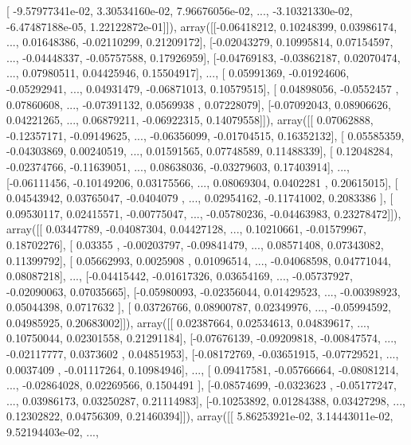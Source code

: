 \documentclass{article}
\begin{document}
       [ -9.57977341e-02,   3.30534160e-02,   7.96676056e-02, ...,
         -3.10321330e-02,  -6.47487188e-05,   1.22122872e-01]]), array([[-0.06418212,  0.10248399,  0.03986174, ...,  0.01648386,
        -0.02110299,  0.21209172],
       [-0.02043279,  0.10995814,  0.07154597, ..., -0.04448337,
        -0.05757588,  0.17926959],
       [-0.04769183, -0.03862187,  0.02070474, ...,  0.07980511,
         0.04425946,  0.15504917],
       ..., 
       [ 0.05991369, -0.01924606, -0.05292941, ...,  0.04931479,
        -0.06871013,  0.10579515],
       [ 0.04898056, -0.0552457 ,  0.07860608, ..., -0.07391132,
         0.0569938 ,  0.07228079],
       [-0.07092043,  0.08906626,  0.04221265, ...,  0.06879211,
        -0.06922315,  0.14079558]]), array([[ 0.07062888, -0.12357171, -0.09149625, ..., -0.06356099,
        -0.01704515,  0.16352132],
       [ 0.05585359, -0.04303869,  0.00240519, ...,  0.01591565,
         0.07748589,  0.11488339],
       [ 0.12048284, -0.02374766, -0.11639051, ...,  0.08638036,
        -0.03279603,  0.17403914],
       ..., 
       [-0.06111456, -0.10149206,  0.03175566, ...,  0.08069304,
         0.0402281 ,  0.20615015],
       [ 0.04543942,  0.03765047, -0.0404079 , ...,  0.02954162,
        -0.11741002,  0.2083386 ],
       [ 0.09530117,  0.02415571, -0.00775047, ..., -0.05780236,
        -0.04463983,  0.23278472]]), array([[ 0.03447789, -0.04087304,  0.04427128, ...,  0.10210661,
        -0.01579967,  0.18702276],
       [ 0.03355   , -0.00203797, -0.09841479, ...,  0.08571408,
         0.07343082,  0.11399792],
       [ 0.05662993,  0.0025908 ,  0.01096514, ..., -0.04068598,
         0.04771044,  0.08087218],
       ..., 
       [-0.04415442, -0.01617326,  0.03654169, ..., -0.05737927,
        -0.02090063,  0.07035665],
       [-0.05980093, -0.02356044,  0.01429523, ..., -0.00398923,
         0.05044398,  0.0717632 ],
       [ 0.03726766,  0.08900787,  0.02349976, ..., -0.05994592,
         0.04985925,  0.20683002]]), array([[ 0.02387664,  0.02534613,  0.04839617, ...,  0.10750044,
         0.02301558,  0.21291184],
       [-0.07676139, -0.09209818, -0.00847574, ..., -0.02117777,
         0.0373602 ,  0.04851953],
       [-0.08172769, -0.03651915, -0.07729521, ...,  0.0037409 ,
        -0.01117264,  0.10984946],
       ..., 
       [ 0.09417581, -0.05766664, -0.08081214, ..., -0.02864028,
         0.02269566,  0.1504491 ],
       [-0.08574699, -0.0323623 , -0.05177247, ...,  0.03986173,
         0.03250287,  0.21114983],
       [-0.10253892,  0.01284388,  0.03427298, ...,  0.12302822,
         0.04756309,  0.21460394]]), array([[  5.86253921e-02,   3.14443011e-02,   9.52194403e-02, ...,
\end{document}
